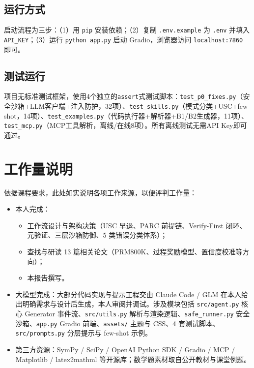 \documentclass[12pt,a4paper]{ctexart}
\begin{document}
\subsection{运行方式}

启动流程为三步：（1）用 \texttt{pip} 安装依赖；（2）复制 \texttt{.env.example} 为 \texttt{.env} 并填入 \texttt{API\_KEY}；（3）运行 \texttt{python app.py} 启动 Gradio，浏览器访问 \texttt{localhost:7860} 即可。

\subsection{测试运行}

项目无标准测试框架，使用4个独立的\verb|assert|式测试脚本：\verb|test_p0_fixes.py|（安全沙箱+LLM客户端+注入防护，32项）、\verb|test_skills.py|（模式分类+USC+few-shot，14项）、\verb|test_examples.py|（代码执行器+解析器+B1/B2生成器，11项）、\verb|test_mcp.py|（MCP工具解析，离线/在线8项）。所有离线测试无需API Key即可通过。

\section{工作量说明}

依据课程要求，此处如实说明各项工作来源，以便评判工作量：

\begin{itemize}[nosep]
  \item 本人完成：
  \begin{itemize}[nosep]
    \item 工作流设计与架构决策（USC 早退、PARC 前提链、Verify-First 闭环、元验证、三层沙箱防御、5 类错误分类体系）；
    \item 查找与研读 13 篇相关论文（PRM800K、过程奖励模型、置信度校准等方向）；
    \item 本报告撰写。
  \end{itemize}
  \item 大模型完成：大部分代码实现与提示工程交由 Claude Code / GLM 在本人给出明确需求与设计后生成，本人审阅并调试。涉及模块包括 \texttt{src/agent.py} 核心 Generator 事件流、\texttt{src/utils.py} 解析与渲染逻辑、\texttt{safe\_runner.py} 安全沙箱、\texttt{app.py} Gradio 前端、\texttt{assets/} 主题与 CSS、4 套测试脚本、\texttt{src/prompts.py} 分层提示与 few-shot 示例。
  \item 第三方资源：SymPy / SciPy / OpenAI Python SDK / Gradio / MCP / Matplotlib / latex2mathml 等开源库；数学题素材取自公开教材与课堂例题。
\end{itemize}
\end{document}
